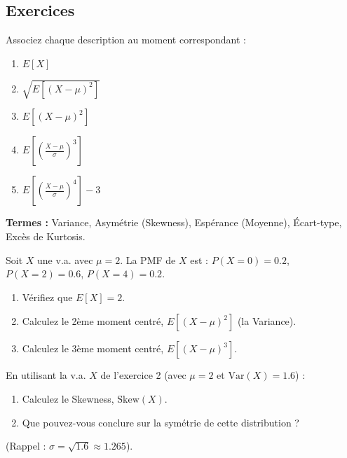\subsection{Exercices}


\begin{exercicebox}
Associez chaque description au moment correspondant :
\begin{enumerate}
    \item $E[X]$
    \item $\sqrt{E[(X-\mu)^2]}$
    \item $E[(X-\mu)^2]$
    \item $E[\left(\frac{X-\mu}{\sigma}\right)^3]$
    \item $E[\left(\frac{X-\mu}{\sigma}\right)^4] - 3$
\end{enumerate}

\textbf{Termes :} Variance, Asymétrie (Skewness), Espérance (Moyenne), Écart-type, Excès de Kurtosis.
\end{exercicebox}

\begin{exercicebox}
Soit $X$ une v.a. avec $\mu = 2$. La PMF de $X$ est :
$P(X=0)=0.2$, $P(X=2)=0.6$, $P(X=4)=0.2$.
\begin{enumerate}
    \item Vérifiez que $E[X] = 2$.
    \item Calculez le 2ème moment centré, $E[(X-\mu)^2]$ (la Variance).
    \item Calculez le 3ème moment centré, $E[(X-\mu)^3]$.
\end{enumerate}
\end{exercicebox}

\begin{exercicebox}
En utilisant la v.a. $X$ de l'exercice 2 (avec $\mu=2$ et $\text{Var}(X) = 1.6$) :
\begin{enumerate}
    \item Calculez le Skewness, $\text{Skew}(X)$.
    \item Que pouvez-vous conclure sur la symétrie de cette distribution ?
\end{enumerate}
(Rappel : $\sigma = \sqrt{1.6} \approx 1.265$).
\end{exercicebox}


